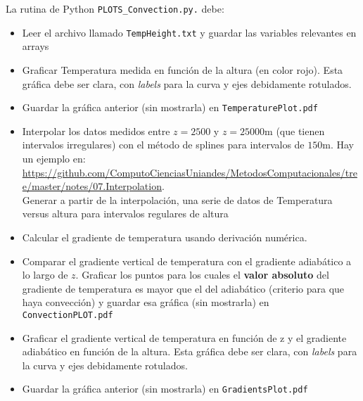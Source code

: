 \documentclass[11pt,letterpaper]{exam}
\begin{document}
\begin{questions}
La rutina de Python \verb"PLOTS_Convection.py." debe:
\begin{itemize}
\item{Leer el archivo llamado \verb"TempHeight.txt" y guardar las variables relevantes en arrays}
\item{Graficar Temperatura medida en función de la altura (en color rojo). 
Esta gráfica debe ser clara, con \emph{labels} para la curva y ejes debidamente rotulados.}
\item{Guardar la gráfica anterior (sin mostrarla) en \verb"TemperaturePlot.pdf"}
\item{Interpolar los datos medidos entre $z=2500$ y $z=25000$m (que tienen intervalos irregulares) con el método de splines para intervalos de $150$m. Hay un ejemplo en:\\
 {\small \url{https://github.com/ComputoCienciasUniandes/MetodosComputacionales/tree/master/notes/07.Interpolation}}.\\
Generar a partir de la interpolación, una serie de datos de Temperatura versus altura para intervalos regulares de altura}
\item{Calcular el gradiente de temperatura usando derivación numérica.}
\item{Comparar el gradiente vertical de temperatura con el gradiente adiabático a lo largo de $z$. Graficar los puntos para los cuales el {\bf valor absoluto} del gradiente de temperatura es mayor que el del adiabático (criterio para que haya convección) y guardar esa gráfica (sin mostrarla) en \verb"ConvectionPLOT.pdf" }
\item{Graficar el gradiente vertical de temperatura en función de z y el gradiente adiabático en función de la altura. 
Esta gráfica debe ser clara, con \emph{labels} para la curva y ejes debidamente rotulados.}
\item{Guardar la gráfica anterior (sin mostrarla) en \verb"GradientsPlot.pdf"}
\end{itemize}

\end{questions}
\end{document}
